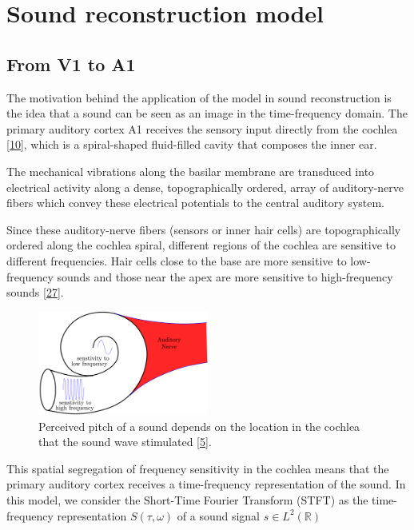 \documentclass[american,]{article}
\theoremstyle{definition}
\theoremstyle{definition}
\theoremstyle{definition}
\theoremstyle{remark}
\begin{document}
\pagebreak

\hypertarget{sound-reconstruction-model}{%
\section{Sound reconstruction model}\label{sound-reconstruction-model}}

\hypertarget{from-v1-to-a1}{%
\subsection{From V1 to A1}\label{from-v1-to-a1}}

The motivation behind the application of the model in sound reconstruction
is the idea that a sound can be seen as an image in the time-frequency domain.
The primary auditory cortex A1 receives the sensory input directly from the cochlea {[}\protect\hyperlink{ref-dallos1996}{10}{]},
which is a spiral-shaped fluid-filled cavity that composes the inner ear.

The mechanical vibrations along the basilar membrane are transduced into electrical activity
along a dense, topographically ordered, array of auditory-nerve fibers
which convey these electrical potentials to the central auditory system.

Since these auditory-nerve fibers (sensors or inner hair cells) are topographically ordered
along the cochlea spiral, different regions of the cochlea are sensitive to different frequencies.
Hair cells close to the base are more sensitive to low-frequency sounds and those near the apex
are more sensitive to high-frequency sounds {[}\protect\hyperlink{ref-yang1992}{27}{]}.

\begin{figure}
\centering
\includegraphics[width=0.5\textwidth,height=\textheight]{img/cochlea.png}
\caption{Perceived pitch of a sound depends on the location in the cochlea that the sound wave stimulated {[}\protect\hyperlink{ref-boscain2021}{5}{]}.}
\end{figure}

This spatial segregation of frequency sensitivity in the cochlea
means that the primary auditory cortex receives a time-frequency representation of the sound.
In this model, we consider the Short-Time Fourier Transform (STFT)
as the time-frequency representation \(S(\tau,\omega)\) of a sound signal \(s\in L^2(\mathbb{R})\)
\end{document}
